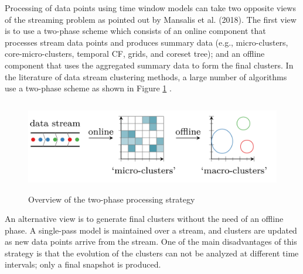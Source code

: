 



Processing of data points using time window models can take two opposite views of the streaming problem as pointed out by Mansalis et al. (2018). The first view is to use a two-phase scheme which consists of an online component that processes stream data points and produces summary data  (e.g., micro-clusters, core-micro-clusters, temporal CF, grids, and coreset tree); and an offline component that uses the aggregated summary data to form the final clusters. In the literature of data stream clustering methods, a large number of algorithms use a two-phase scheme as shown in Figure \ref{2phase} . 

\begin{figure}[t]
\centering
\includegraphics[width = 15cm,height = 4cm]{image/Chapters/Chapter2/2phase.png}
\caption{Overview of the two-phase processing strategy \protect\cite{carnein2019optimizing}}
\label{2phase}
\end{figure}

An alternative view is to generate final clusters without the need of an offline phase. A single-pass model is maintained over a stream, and clusters are updated as new data points arrive from the stream. One of the main disadvantages of this strategy is that the evolution of the clusters can not be analyzed at different time intervals; only a final snapshot is produced.     

